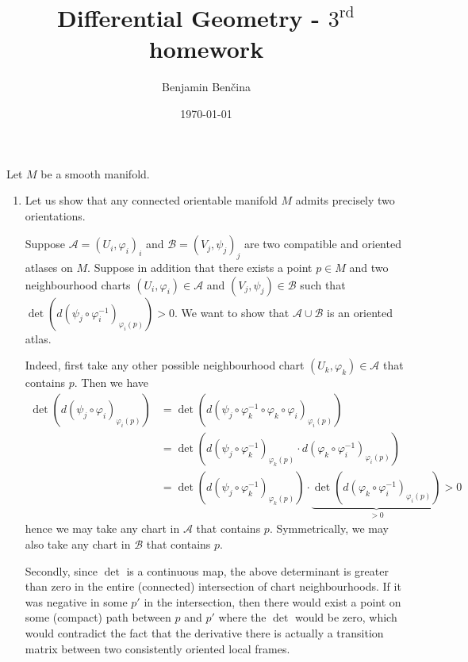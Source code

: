 \documentclass[a4paper, 12pt]{article}
\title{Differential Geometry - $3^\text{rd}$ homework}
\author{Benjamin Benčina}
\date{\today}
\begin{document}
\maketitle

\begin{Exercise}
    Let $M$ be a smooth manifold.
    \begin{enumerate}[label=(\roman*)]
        \item Let us show that any connected orientable manifold $M$ admits precisely two orientations.

            Suppose $\mathcal{A} = (U_i, \varphi_i)_i$ and $\mathcal{B} = (V_j, \psi_j)_j$ are two compatible and oriented atlases on $M$.
            Suppose in addition that there exists a point $p \in M$ and two neighbourhood charts $(U_i, \varphi_i) \in \mathcal{A}$ and $(V_j, \psi_j) \in \mathcal{B}$
            such that $\det(d(\psi_j\circ\varphi_i^{-1})_{\varphi_i(p)}) > 0$.
            We want to show that $\mathcal{A} \cup \mathcal{B}$ is an oriented atlas.

            Indeed, first take any other possible neighbourhood chart $(U_k, \varphi_k) \in \mathcal{A}$ that contains $p$.
            Then we have
            \begin{align*}
                \det(d(\psi_j \circ \varphi_i)_{\varphi_i(p)})
                &= \det(d(\psi_j \circ \varphi_k^{-1} \circ \varphi_k \circ \varphi_i)_{\varphi_i(p)}) \\
                &= \det(d(\psi_j \circ \varphi_k^{-1})_{\varphi_k(p)}\cdot d(\varphi_k \circ \varphi_i^{-1})_{\varphi_i(p)}) \\
                &= \det(d(\psi_j \circ \varphi_k^{-1})_{\varphi_k(p)})\cdot \underbrace{\det(d(\varphi_k \circ \varphi_i^{-1})_{\varphi_i(p)})}_{> 0} > 0
            \end{align*}
            hence we may take any chart in $\mathcal{A}$ that contains $p$.
            Symmetrically, we may also take any chart in $\mathcal{B}$ that contains $p$.

            Secondly, since $\det$ is a continuous map, the above determinant is greater than zero in the entire (connected) intersection of chart neighbourhoods.
            If it was negative in some $p'$ in the intersection, then there would exist a point on some (compact) path between $p$ and $p'$ where the $\det$ would be zero,
            which would contradict the fact that the derivative there is actually a transition matrix between two consistently oriented local frames.


\end{enumerate}
\end{Exercise}
\end{document}
